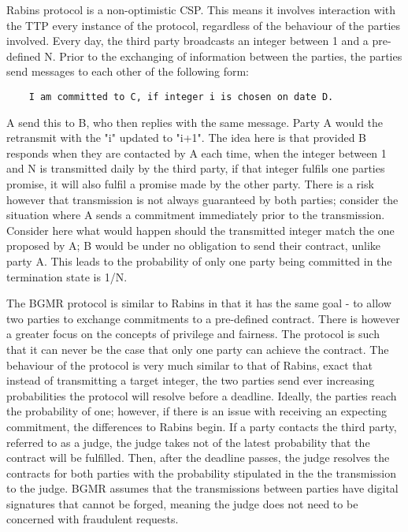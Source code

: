 \documentclass{l4proj}
\begin{document}
Rabins protocol is a non-optimistic CSP. This means it involves interaction with the TTP every instance of the protocol, regardless of the behaviour of the parties involved. Every day, the third party broadcasts an integer between 1 and a pre-defined N. Prior to the exchanging of information between the parties, the parties send messages to each other of the following form:
\begin{lstlisting}
    I am committed to C, if integer i is chosen on date D.
\end{lstlisting}
A send this to B, who then replies with the same message. Party A would the retransmit with the "i" updated to "i+1". The idea here is that provided B responds when they are contacted by A each time, when the integer between 1 and N is transmitted daily by the third party, if that integer fulfils one parties promise, it will also fulfil a promise made by the other party. There is a risk however that transmission is not always guaranteed by both parties; consider the situation where A sends a commitment immediately prior to the transmission. Consider here what would happen should the transmitted integer match the one proposed by A; B would be under no obligation to send their contract, unlike party A. This leads to the probability of only one party being committed in the termination state is 1/N.

The BGMR protocol is similar to Rabins in that it has the same goal - to allow  two parties to exchange commitments to a pre-defined contract. There is however a greater focus on the concepts of privilege and fairness. The protocol is such that it can never be the case that only one party can achieve the contract. The behaviour of the protocol is very much similar to that of Rabins, exact that instead of transmitting a target integer, the two parties send ever increasing probabilities the protocol will resolve before a deadline. Ideally, the parties reach the probability of one; however, if there is an issue with receiving an expecting commitment, the differences to Rabins begin. If a party contacts the third party, referred to as a judge, the judge takes not of the latest probability that the contract will be fulfilled. Then, after the deadline passes, the judge resolves the contracts for both parties with the probability stipulated in the the transmission to the judge. BGMR assumes that the transmissions between parties have  digital signatures that cannot be forged, meaning the judge does not need to be concerned with fraudulent requests.
\end{document}
